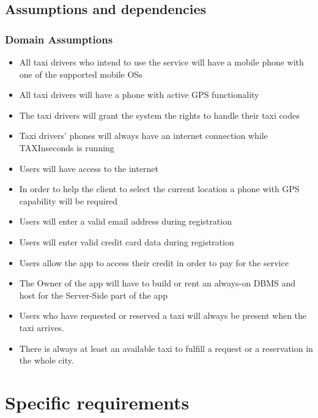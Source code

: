 \documentclass{article}
\begin{document}
\subsection{Assumptions and dependencies}
\subsubsection{Domain Assumptions}
\begin{itemize}
	\item All taxi drivers who intend to use the service will have a mobile phone with one of the supported mobile OSs
	\item All taxi drivers will have a phone with active GPS functionality %
	\item The taxi drivers will grant the system the rights to handle their taxi codes
	\item Taxi drivers' phones will always have an internet connection while TAXInseconds is running
	\item Users will have access to the internet %
	\item In order to help the client to select the current location a phone with GPS capability will be required %
	\item Users will enter a valid email address during registration 
	\item Users will enter valid credit card data during registration
	\item Users allow the app to access their credit in order to pay for the service
	\item The Owner of the app will have to build or rent an always-on DBMS and host for the Server-Side part of the app %
	\item Users who have requested or reserved a taxi will always be present when the taxi arrives.
	\item There is always at least an available taxi to fulfill a request or a reservation in the whole city.
\end{itemize}
\clearpage
\section{Specific requirements}
\end{document}
